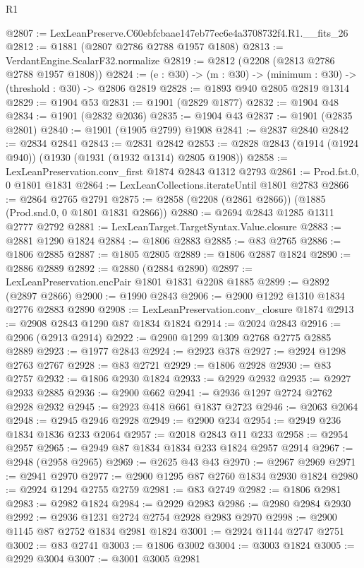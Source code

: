 \begin{lexlean}{R1}
\begin{coremodule}
@2807 := LexLeanPreserve.C60ebfcbaae147eb77ec6e4a3708732f4.R1.__fits_26
@2812 := @1881 (@2807 @2786 @2788 @1957 @1808)
@2813 := VerdantEngine.ScalarF32.normalize
@2819 := @2812 (@2208 (@2813 @2786 @2788 @1957 @1808))
@2824 := (e : @30) -> (m : @30) -> (minimum : @30) -> (threshold : @30) -> @2806 @2819
@2828 := @1893 @940 @2805 @2819 @1314
@2829 := @1904 @53
@2831 := @1901 (@2829 @1877)
@2832 := @1904 @48
@2834 := @1901 (@2832 @2036)
@2835 := @1904 @43
@2837 := @1901 (@2835 @2801)
@2840 := @1901 (@1905 @2799) @1908
@2841 := @2837 @2840
@2842 := @2834 @2841
@2843 := @2831 @2842
@2853 := @2828 @2843 (@1914 (@1924 @940)) (@1930 (@1931 (@1932 @1314) @2805 @1908))
@2858 := LexLeanPreservation.conv_first @1874 @2843 @1312 @2793
@2861 := Prod.fst.{0, 0} @1801 @1831
@2864 := LexLeanCollections.iterateUntil @1801 @2783
@2866 := @2864 @2765 @2791
@2875 := @2858 (@2208 (@2861 @2866)) (@1885 (Prod.snd.{0, 0} @1801 @1831 @2866))
@2880 := @2694 @2843 @1285 @1311 @2777 @2792
@2881 := LexLeanTarget.TargetSyntax.Value.closure
@2883 := @2881 @1290 @1824
@2884 := @1806 @2883
@2885 := @83 @2765
@2886 := @1806 @2885
@2887 := @1805 @2805
@2889 := @1806 @2887 @1824
@2890 := @2886 @2889
@2892 := @2880 (@2884 @2890)
@2897 := LexLeanPreservation.encPair @1801 @1831 @2208 @1885
@2899 := @2892 (@2897 @2866)
@2900 := @1990 @2843
@2906 := @2900 @1292 @1310 @1834 @2776 @2883 @2890
@2908 := LexLeanPreservation.conv_closure @1874
@2913 := @2908 @2843 @1290 @87 @1834 @1824
@2914 := @2024 @2843
@2916 := @2906 (@2913 @2914)
@2922 := @2900 @1299 @1309 @2768 @2775 @2885 @2889
@2923 := @1977 @2843
@2924 := @2923 @378
@2927 := @2924 @1298 @2763 @2767
@2928 := @83 @2721
@2929 := @1806 @2928
@2930 := @83 @2757
@2932 := @1806 @2930 @1824
@2933 := @2929 @2932
@2935 := @2927 @2933 @2885
@2936 := @2900 @662
@2941 := @2936 @1297 @2724 @2762 @2928 @2932
@2945 := @2923 @418 @661 @1837 @2723
@2946 := @2063 @2064
@2948 := @2945 @2946 @2928
@2949 := @2900 @234
@2954 := @2949 @236 @1834 @1836 @233 @2064
@2957 := @2018 @2843 @11 @233
@2958 := @2954 @2957
@2965 := @2949 @87 @1834 @1834 @233 @1824 @2957 @2914
@2967 := @2948 (@2958 @2965)
@2969 := @2625 @43 @43
@2970 := @2967 @2969
@2971 := @2941 @2970
@2977 := @2900 @1295 @87 @2760 @1834 @2930 @1824
@2980 := @2924 @1294 @2755 @2759
@2981 := @83 @2749
@2982 := @1806 @2981
@2983 := @2982 @1824
@2984 := @2929 @2983
@2986 := @2980 @2984 @2930
@2992 := @2936 @1231 @2724 @2754 @2928 @2983 @2970
@2998 := @2900 @1145 @87 @2752 @1834 @2981 @1824
@3001 := @2924 @1144 @2747 @2751
@3002 := @83 @2741
@3003 := @1806 @3002
@3004 := @3003 @1824
@3005 := @2929 @3004
@3007 := @3001 @3005 @2981

\end{coremodule}
\end{lexlean}
